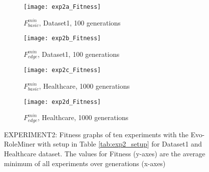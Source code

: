 \begin{figure}[H]
	\centering
	\begin{subfigure}{0.5\textwidth}
		\texttt{[image: exp2a\_Fitness]}
		\caption{$F_{basic}^{min}$, Dataset1, 100 generations}
		\label{fig:exp2a_Fitness}
	\end{subfigure}%
	\begin{subfigure}{0.5\textwidth}
		\centering
		\texttt{[image: exp2b\_Fitness]}
		\caption{$F_{edge}^{min}$, Dataset1, 100 generations}
		\label{fig:exp2b_Fitness}
	\end{subfigure}
	
	\begin{subfigure}{0.5\textwidth}
		\texttt{[image: exp2c\_Fitness]}
		\caption{$F_{basic}^{min}$, Healthcare, 1000 generations}
		\label{fig:exp2c_Fitness}
	\end{subfigure}%
	\begin{subfigure}{0.5\textwidth}
		\centering
		\texttt{[image: exp2d\_Fitness]}
		\caption{$F_{edge}^{min}$, Healthcare, 1000 generations}
		\label{fig:exp2d_Fitness}
	\end{subfigure}
	\caption{EXPERIMENT2: Fitness graphs of ten experiments with the Evo-RoleMiner with setup in Table \ref{tab:exp2_setup} for Dataset1 and Healthcare dataset. The values for Fitness (y-axes) are the average minimum of all experiments over generations (x-axes)}
	\label{fig:Results_Exp2_FitnessGraphs}
\end{figure}

